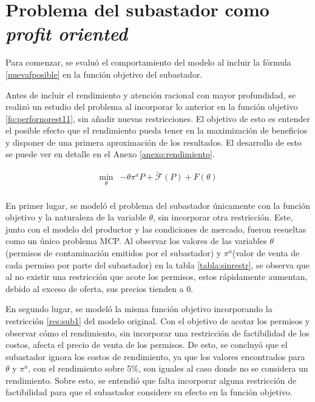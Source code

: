 \section{Problema del subastador como \textit{profit oriented}}\label{profit}



Para comenzar, se evaluó el comportamiento del modelo al incluir la fórmula \ref{nuevafposible} en la función objetivo del subastador.
\vspace{2.5mm}

Antes de incluir el rendimiento y atención racional con mayor profundidad, se realizó un estudio del problema al incorporar lo anterior en la función objetivo \ref{fo:perfornorest11}, sin añadir nuevas restricciones. El objetivo de esto es entender el posible efecto que el rendimiento pueda tener en la maximización de beneficios y disponer de una primera aproximación de los resultados. El desarrollo de esto se puede ver en detalle en el Anexo \ref{anexo:rendimiento}. \vspace{2.5mm}

\begin{equation}
\begin{array}{rrclcl}
    \displaystyle \min_{\theta} & -\theta \pi^aP + \tilde{\mathcal{F}}(P)+F(\theta)  \label{fo:perfornorest11}\\
\end{array}
\end{equation}

En primer lugar, se modeló el problema del subastador únicamente con la función objetivo y la naturaleza de la variable $\theta$, sin incorporar otra restricción. Este, junto con el modelo del productor y las condiciones de mercado, fueron resueltas como un único problema MCP. Al observar los valores de las variables $\theta$ (permisos de contaminación emitidos por el subastador) y $\pi^a$(valor de venta de cada permiso por parte del subastador) en la tabla \ref{tabla:sinrestr}, se observa que al no existir una restricción que acote los permisos, estos rápidamente aumentan, debido al exceso de oferta, sus precios tienden a 0.
\vspace{2.5mm}

En segundo lugar, se modeló la misma función objetivo incorporando la restricción \ref{res:sub1} del modelo original. Con el objetivo de acotar los permisos y observar cómo el rendimiento, sin incorporar una restricción de factibilidad de los costos, afecta el precio de venta de los permisos. De esto, se concluyó que el subastador ignora los costos de rendimiento, ya que los valores encontrados para $\theta$ y  $\pi^a$, con el rendimiento sobre 5\%, son iguales al caso donde no se considera un rendimiento. Sobre esto, se entendió que falta incorporar alguna restricción de factibilidad para que el subastador considere su efecto en la función objetivo.
\vspace{2.5mm}

